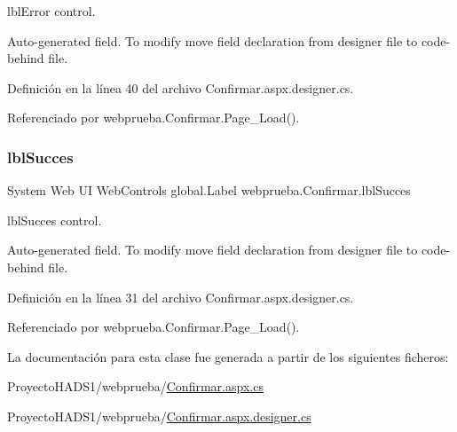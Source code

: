 lbl\+Error control. 

Auto-\/generated field. To modify move field declaration from designer file to code-\/behind file. 

Definición en la línea 40 del archivo Confirmar.\+aspx.\+designer.\+cs.



Referenciado por webprueba.\+Confirmar.\+Page\+\_\+\+Load().

\mbox{\label{classwebprueba_1_1_confirmar_ad8c4c024a1344980ca8d632b482a2691}} 
\subsubsection{\texorpdfstring{lblSucces}{lblSucces}}
{\footnotesize\ttfamily System Web UI Web\+Controls global.\+Label webprueba.\+Confirmar.\+lbl\+Succes\hspace{0.3cm}{\ttfamily [protected]}}



lbl\+Succes control. 

Auto-\/generated field. To modify move field declaration from designer file to code-\/behind file. 

Definición en la línea 31 del archivo Confirmar.\+aspx.\+designer.\+cs.



Referenciado por webprueba.\+Confirmar.\+Page\+\_\+\+Load().



La documentación para esta clase fue generada a partir de los siguientes ficheros\+:\begin{DoxyCompactItemize}
\item 
Proyecto\+H\+A\+D\+S1/webprueba/\mbox{\hyperlink{_proyecto_h_a_d_s1_2webprueba_2_confirmar_8aspx_8cs}{Confirmar.\+aspx.\+cs}}\item 
Proyecto\+H\+A\+D\+S1/webprueba/\mbox{\hyperlink{_proyecto_h_a_d_s1_2webprueba_2_confirmar_8aspx_8designer_8cs}{Confirmar.\+aspx.\+designer.\+cs}}\end{DoxyCompactItemize}
